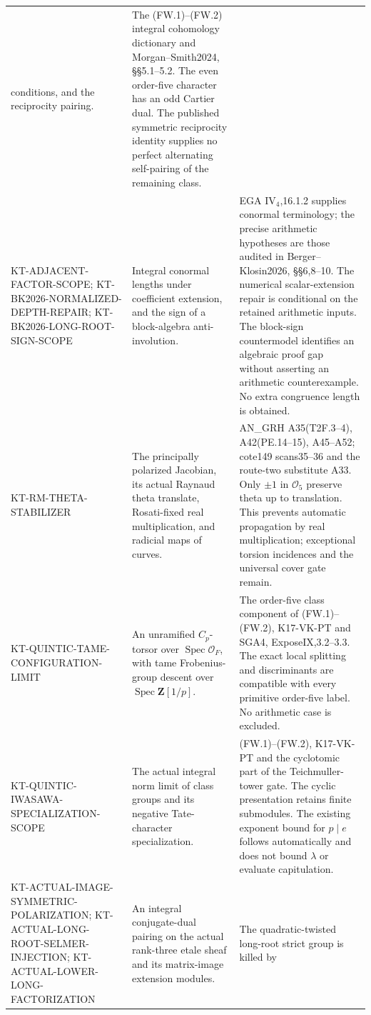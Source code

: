 \begin{longtable}{>{\raggedright\arraybackslash}p{}
>{\raggedright\arraybackslash}p{}
>{\raggedright\arraybackslash}p{}}
conditions, and the reciprocity pairing. &
The (FW.1)--(FW.2) integral cohomology dictionary and
Morgan--Smith2024, \S\S5.1--5.2.
The even order-five character has an odd Cartier dual.
The published symmetric reciprocity identity supplies no
perfect alternating self-pairing of the remaining class.\\
KT-ADJACENT-FACTOR-SCOPE;
KT-BK2026-NORMALIZED-DEPTH-REPAIR;
KT-BK2026-LONG-ROOT-SIGN-SCOPE &
Integral conormal lengths under coefficient extension,
and the sign of a block-algebra anti-involution. &
EGA IV$_4$,16.1.2 supplies conormal terminology;
the precise arithmetic hypotheses are those audited in
Berger--Klosin2026, \S\S6,8--10.
The numerical scalar-extension repair is conditional on
the retained arithmetic inputs. The block-sign countermodel
identifies an algebraic proof gap without asserting an
arithmetic counterexample. No extra congruence length is obtained.\\
KT-RM-THETA-STABILIZER &
The principally polarized Jacobian, its actual Raynaud theta
translate, Rosati-fixed real multiplication, and radicial
maps of curves. &
AN\_GRH A35(T2F.3--4), A42(PE.14--15), A45--A52;
cote149 scans35--36 and the route-two substitute A33.
Only $\pm1$ in $\mathcal O_5$ preserve theta up to translation.
This prevents automatic propagation by real multiplication;
exceptional torsion incidences and the universal cover gate remain.\\
KT-QUINTIC-TAME-CONFIGURATION-LIMIT &
An unramified $C_p$-torsor over $\operatorname{Spec}\mathcal O_F$,
with tame Frobenius-group descent over $\operatorname{Spec}\mathbf Z[1/p]$. &
The order-five class component of (FW.1)--(FW.2),
K17-VK-PT and SGA4, ExposeIX,3.2--3.3.
The exact local splitting and discriminants are compatible
with every primitive order-five label. No arithmetic case is excluded.\\
KT-QUINTIC-IWASAWA-SPECIALIZATION-SCOPE &
The actual integral norm limit of class groups and its
negative Tate-character specialization. &
(FW.1)--(FW.2), K17-VK-PT and the cyclotomic part of the
Teichmuller-tower gate. The cyclic presentation retains finite
submodules. The existing exponent bound for $p\mid e$ follows
automatically and does not bound $\lambda$ or evaluate capitulation.\\
KT-ACTUAL-IMAGE-SYMMETRIC-POLARIZATION;
KT-ACTUAL-LONG-ROOT-SELMER-INJECTION;
KT-ACTUAL-LOWER-LONG-FACTORIZATION &
An integral conjugate-dual pairing on the actual rank-three
etale sheaf and its matrix-image extension modules. &
The quadratic-twisted long-root strict group is killed by

\end{longtable}
